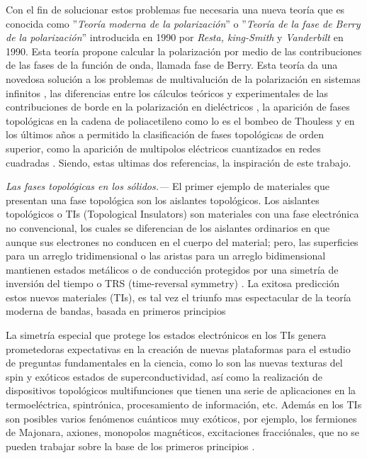 Con el fin de solucionar estos problemas fue necesaria una nueva teoría que es conocida como ''\textit{Teoría moderna de la polarización}'' o ''\textit{Teoría de la fase de Berry de la polarización}'' introducida en 1990 por \textit{Resta, king-Smith} y \textit{Vanderbilt} en 1990. Esta teoría propone calcular la polarización por medio de las contribuciones de las fases de la función de onda, llamada fase de Berry. Esta teoría da una novedosa solución a los problemas de multivalución de la polarización en sistemas infinitos \cite{spaldin2012beginner}, las diferencias entre los cálculos teóricos y experimentales de las contribuciones de borde en la polarización en dieléctricos \cite{rabe2007modern}, la aparición de fases topológicas en la cadena de poliacetileno como lo es el bombeo de Thouless  y en los últimos años a permitido la clasificación de fases topológicas de orden superior, como la aparición de multipolos eléctricos cuantizados en redes cuadradas \cite{Benalcazar2017}. Siendo, estas ultimas dos referencias, la inspiración de este trabajo.  


{\it Las fases topológicas en los sólidos.---} El primer ejemplo de materiales que presentan una fase topológica son los aislantes topológicos. Los aislantes topológicos o TIs (Topological Insulators) son materiales con una fase electrónica no convencional, los cuales se diferencian de los aislantes ordinarios en que aunque sus electrones no conducen en el cuerpo del material; pero, las superficies para un arreglo tridimensional o las aristas para un arreglo bidimensional mantienen estados metálicos o de conducción protegidos por una simetría de inversión del tiempo o TRS (time-reversal symmetry) \cite{Shore2018}. La exitosa predicción estos nuevos materiales (TIs), es tal vez el triunfo mas espectacular de la teoría moderna de bandas, basada en primeros principios  

La simetría especial que protege los estados electrónicos en los TIs genera prometedoras expectativas  en la creación de nuevas plataformas para el estudio de preguntas fundamentales en la ciencia, como lo son las nuevas texturas del spin y exóticos estados de superconductividad,  así como la realización de dispositivos topológicos multifunciones que tienen una serie de aplicaciones en la termoeléctrica, spintrónica, procesamiento de información, etc. Además en los TIs son posibles varios fenómenos cuánticos muy exóticos, por ejemplo, los fermiones de Majonara, axiones, monopolos magnéticos, excitaciones fracciónales, que no se pueden trabajar sobre la base de los primeros principios \cite{Moore2010}.

